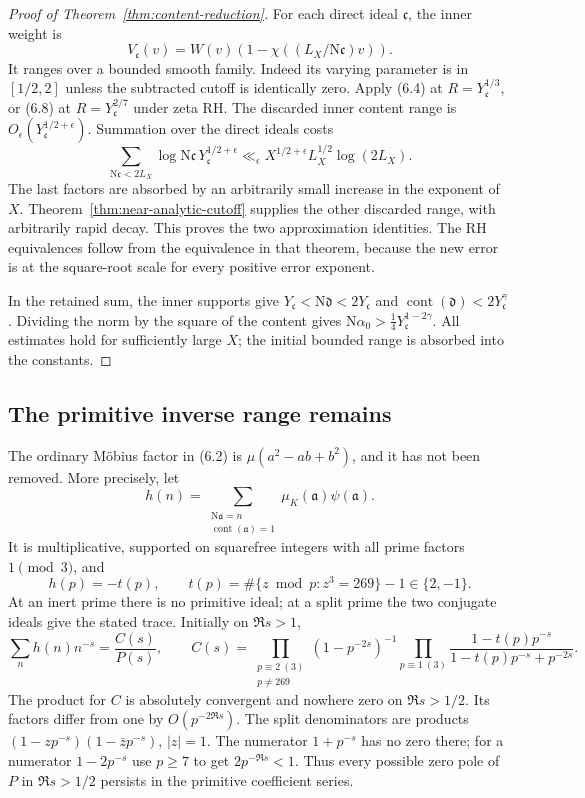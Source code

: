 \documentclass[11pt]{article}
\newcommand{\N}{\mathrm N}
\begin{document}
\begin{proof}[Proof of Theorem~\ref{thm:content-reduction}]
For each direct ideal $\mathfrak c$, the inner weight is
\[
 V_{\mathfrak c}(v)=W(v)(1-\chi((L_X/\N\mathfrak c)v)).
\]
It ranges over a bounded smooth family. Indeed its varying
parameter is in $[1/2,2]$ unless the subtracted cutoff
is identically zero.
Apply (6.4) at $R=Y_{\mathfrak c}^{1/3}$, or (6.8) at
$R=Y_{\mathfrak c}^{2/7}$ under zeta RH.
The discarded inner content range is
$O_\epsilon(Y_{\mathfrak c}^{1/2+\epsilon})$.
Summation over the direct ideals costs
\[
 \sum_{\N\mathfrak c<2L_X}\log\N\mathfrak c\,
                         Y_{\mathfrak c}^{1/2+\epsilon}
 \ll_\epsilon X^{1/2+\epsilon}L_X^{1/2}\log(2L_X).
\]
The last factors are absorbed by an arbitrarily small increase
in the exponent of $X$.
Theorem~\ref{thm:near-analytic-cutoff} supplies the other
discarded range, with arbitrarily rapid decay.
This proves the two approximation identities.
The RH equivalences follow from the equivalence in that
theorem, because the new error is at the square-root scale
for every positive error exponent.

In the retained sum, the inner supports give
$Y_{\mathfrak c}<\N\mathfrak d<2Y_{\mathfrak c}$
and $\operatorname{cont}(\mathfrak d)<2Y_{\mathfrak c}^\gamma$.
Dividing the norm by the square of the content gives
$\N\alpha_0>\tfrac14Y_{\mathfrak c}^{1-2\gamma}$.
All estimates hold for sufficiently large $X$; the initial
bounded range is absorbed into the constants.
\end{proof}

\subsection{The primitive inverse range remains}

The ordinary M\"obius factor in (6.2) is
$\mu(a^2-ab+b^2)$, and it has not been removed.
More precisely, let
\[
 h(n)=\sum_{\substack{\N\mathfrak a=n\\
                     \operatorname{cont}(\mathfrak a)=1}}
                         \mu_K(\mathfrak a)\psi(\mathfrak a).
\]
It is multiplicative, supported on squarefree integers with
all prime factors $1\pmod3$, and
\[
 h(p)=-t(p),\qquad
 t(p)=\#\{z\bmod p:z^3=269\}-1\in\{2,-1\}.
\]
At an inert prime there is no primitive ideal; at a split
prime the two conjugate ideals give the stated trace.
Initially on $\Re s>1$,
\[
 \sum_n h(n)n^{-s}=\frac{C(s)}{P(s)},\qquad
 C(s)=
 \prod_{\substack{p\equiv2\ (3)\\p\ne269}}(1-p^{-2s})^{-1}
 \prod_{p\equiv1\ (3)}
       \frac{1-t(p)p^{-s}}{1-t(p)p^{-s}+p^{-2s}}.           \tag{6.9}
\]
The product for $C$ is absolutely convergent and nowhere zero
on $\Re s>1/2$. Its factors differ from one by
$O(p^{-2\Re s})$. The split denominators are products
$(1-zp^{-s})(1-\bar z p^{-s})$, $|z|=1$.
The numerator $1+p^{-s}$ has no zero there; for a numerator
$1-2p^{-s}$ use $p\ge7$ to get $2p^{-\Re s}<1$.
Thus every possible zero pole of $P$ in $\Re s>1/2$
persists in the primitive coefficient series.
\end{document}

